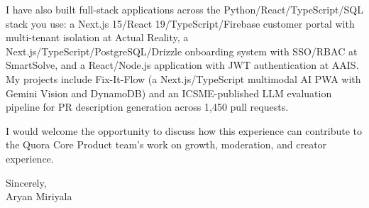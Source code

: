 \documentclass[letterpaper,11pt]{article}
\begin{document}
\vspace{6pt}

I have also built full-stack applications across the Python/React/TypeScript/SQL stack you use: a Next.js 15/React 19/TypeScript/Firebase customer portal with multi-tenant isolation at Actual Reality, a Next.js/TypeScript/PostgreSQL/Drizzle onboarding system with SSO/RBAC at SmartSolve, and a React/Node.js application with JWT authentication at AAIS. My projects include Fix-It-Flow (a Next.js/TypeScript multimodal AI PWA with Gemini Vision and DynamoDB) and an ICSME-published LLM evaluation pipeline for PR description generation across 1,450 pull requests.

\vspace{6pt}

I would welcome the opportunity to discuss how this experience can contribute to the Quora Core Product team's work on growth, moderation, and creator experience.

\vspace{12pt}

Sincerely,\\

Aryan Miriyala
\end{document}
